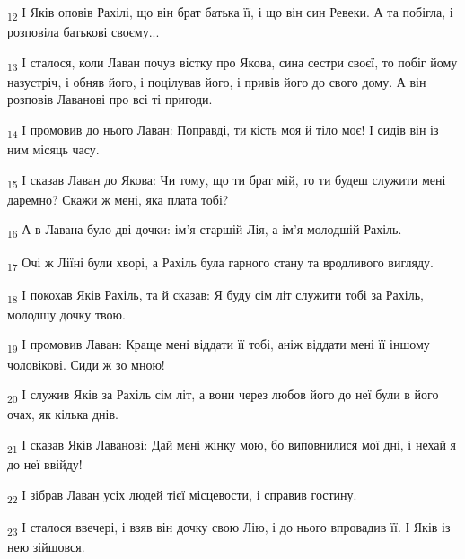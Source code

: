 \begin{tcolorbox}
\textsubscript{12} І Яків оповів Рахілі, що він брат батька її, і що він син Ревеки. А та побігла, і розповіла батькові своєму...
\end{tcolorbox}
\begin{tcolorbox}
\textsubscript{13} І сталося, коли Лаван почув вістку про Якова, сина сестри своєї, то побіг йому назустріч, і обняв його, і поцілував його, і привів його до свого дому. А він розповів Лаванові про всі ті пригоди.
\end{tcolorbox}
\begin{tcolorbox}
\textsubscript{14} І промовив до нього Лаван: Поправді, ти кість моя й тіло моє! І сидів він із ним місяць часу.
\end{tcolorbox}
\begin{tcolorbox}
\textsubscript{15} І сказав Лаван до Якова: Чи тому, що ти брат мій, то ти будеш служити мені даремно? Скажи ж мені, яка плата тобі?
\end{tcolorbox}
\begin{tcolorbox}
\textsubscript{16} А в Лавана було дві дочки: ім'я старшій Лія, а ім'я молодшій Рахіль.
\end{tcolorbox}
\begin{tcolorbox}
\textsubscript{17} Очі ж Ліїні були хворі, а Рахіль була гарного стану та вродливого вигляду.
\end{tcolorbox}
\begin{tcolorbox}
\textsubscript{18} І покохав Яків Рахіль, та й сказав: Я буду сім літ служити тобі за Рахіль, молодшу дочку твою.
\end{tcolorbox}
\begin{tcolorbox}
\textsubscript{19} І промовив Лаван: Краще мені віддати її тобі, аніж віддати мені її іншому чоловікові. Сиди ж зо мною!
\end{tcolorbox}
\begin{tcolorbox}
\textsubscript{20} І служив Яків за Рахіль сім літ, а вони через любов його до неї були в його очах, як кілька днів.
\end{tcolorbox}
\begin{tcolorbox}
\textsubscript{21} І сказав Яків Лаванові: Дай мені жінку мою, бо виповнилися мої дні, і нехай я до неї ввійду!
\end{tcolorbox}
\begin{tcolorbox}
\textsubscript{22} І зібрав Лаван усіх людей тієї місцевости, і справив гостину.
\end{tcolorbox}
\begin{tcolorbox}
\textsubscript{23} І сталося ввечері, і взяв він дочку свою Лію, і до нього впровадив її. І Яків із нею зійшовся.
\end{tcolorbox}
